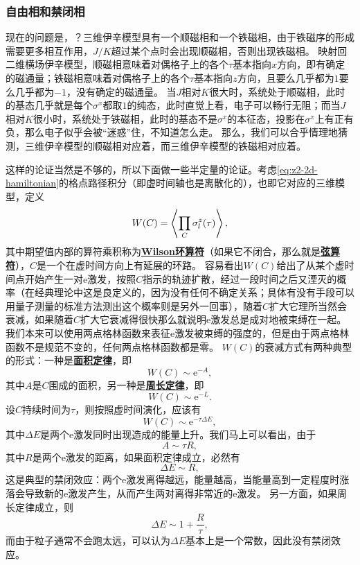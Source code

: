 \documentclass[hyperref, UTF8, a4paper]{ctexart}
\newcommand*{\ee}{\mathrm{e}}
\newcommand*{\concept}[1]{\underline{\textbf{#1}}}
\newcommand*{\Ztwo}{$\mathbb{Z}_2$}
\begin{document}
\subsubsection{自由相和禁闭相}

现在的问题是，？三维伊辛模型具有一个顺磁相和一个铁磁相，由于铁磁序的形成需要更多相互作用，$J/K$超过某个点时会出现顺磁相，否则出现铁磁相。
映射回二维横场伊辛模型，顺磁相意味着对偶格子上的各个$\tau$基本指向$x$方向，即有确定的磁通量；铁磁相意味着对偶格子上的各个$\tau$基本指向$z$方向，且要么几乎都为$1$要么几乎都为$-1$，没有确定的磁通量。
当$J$相对$K$很大时，系统处于顺磁相，此时的基态几乎就是每个$\sigma^x$都取$1$的纯态，此时直觉上看，电子可以畅行无阻；而当$J$相对$K$很小时，系统处于铁磁相，此时的基态不是$\sigma^x$的本征态，投影在$\sigma^x$上有正有负，那么电子似乎会被“迷惑”住，不知道怎么走。
那么，我们可以合乎情理地猜测，三维伊辛模型的顺磁相对应着，而三维伊辛模型的铁磁相对应着。

这样的论证当然是不够的，所以下面做一些半定量的论证。考虑\eqref{eq:z2-2d-hamiltonian}的格点路径积分（即虚时间轴也是离散化的），也即它对应的三维模型，定义
\begin{equation}
    W(C) = \expval{\prod_C \sigma^z_l(\tau)},
\end{equation}
其中期望值内部的算符乘积称为\concept{Wilson环算符}（如果它不闭合，那么就是\concept{弦算符}），$C$是一个在虚时间方向上有延展的环路。
容易看出$W(C)$给出了从某个虚时间点开始产生一对e激发，按照$C$指示的轨迹扩散，经过一段时间之后又湮灭的概率（在经典理论中这是良定义的，因为没有任何不确定关系；具体有没有手段可以用量子测量的标准方法测出这个概率则是另外一回事），随着$C$扩大它理所当然会衰减，如果随着$C$扩大它衰减得很快那么就说明e激发总是成对地被束缚在一起。
我们本来可以使用两点格林函数来表征e激发被束缚的强度的，但是由于两点格林函数不是规范不变的，任何两点格林函数都是零。
$W(C)$的衰减方式有两种典型的形式：一种是\concept{面积定律}，即
\begin{equation}
    W(C) \sim \ee^{-A},
\end{equation}
其中$A$是$C$围成的面积，另一种是\concept{周长定律}，即
\begin{equation}
    W(C) \sim \ee^{-L}.
\end{equation}
设$C$持续时间为$\tau$，则按照虚时间演化，应该有
\[
    W(C) \sim \ee^{-\tau \Delta E},
\]
其中$\Delta E$是两个e激发同时出现造成的能量上升。我们马上可以看出，由于
\[
    A \sim \tau R,
\]
其中$R$是两个e激发的距离，如果面积定律成立，必然有
\[
    \Delta E \sim R,
\]
这是典型的禁闭效应：两个e激发离得越远，能量越高，当能量高到一定程度时涨落会导致新的e激发产生，从而产生两对离得非常近的e激发。
另一方面，如果周长定律成立，则
\[
    \Delta E \sim 1 + \frac{R}{\tau},
\]
而由于粒子通常不会跑太远，可以认为$\Delta E$基本上是一个常数，因此没有禁闭效应。
\end{document}
